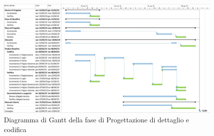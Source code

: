 \begin{figure}[H]
	\includegraphics[width=0.99\linewidth]{res/images/gantt_pd.jpg}
	\caption{Diagramma di Gantt della fase di Progettazione di dettaglio e codifica}
\end{figure}


